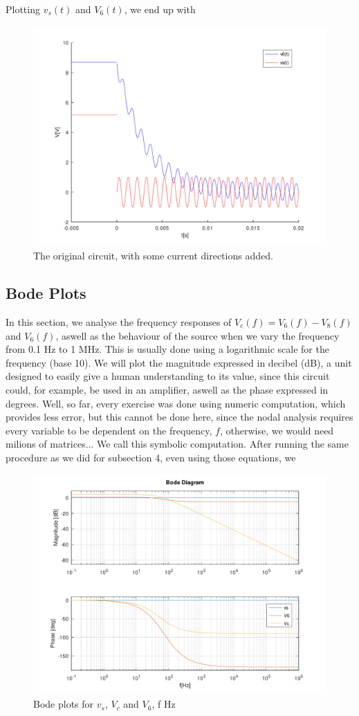 Plotting $v_s(t)$ and $V_6(t)$, we end up with

\begin{figure}[h] \centering
\includegraphics[width=0.4\linewidth]{../mat/t2-t5.pdf}
\caption{The original circuit, with some current directions added.}
\label{cfergter}
\end{figure}

\subsection{Bode Plots}

In this section, we analyse the frequency responses of $V_c(f) = V_6(f) - V_8(f)$ and $V_6(f)$, aswell as the behaviour of the source when we vary the frequency from 0.1 Hz to 1 MHz. This is usually done using a logarithmic scale for the frequency (base 10). We will plot the magnitude expressed in decibel (dB), a unit designed to easily give a human understanding to its value, since this circuit could, for example, be used in an amplifier, aswell as the phase expressed in degrees. Well, so far, every exercise was done using numeric computation, which provides less error, but this cannot be done here, since the nodal analysis requires every variable to be dependent on the frequency, $f$, otherwise, we would need milions of matrices... We call this symbolic computation. After running the same procedure as we did for subsection 4, even using those equations, we 

\begin{figure}[h] \centering
\includegraphics[width=0.4\linewidth]{../mat/t2-t6.pdf}
\caption{Bode plots for $v_s$, $V_c$ and $V_6$, f \in [0.1, $10^6$] Hz}
\label{cfergter}
\end{figure}
